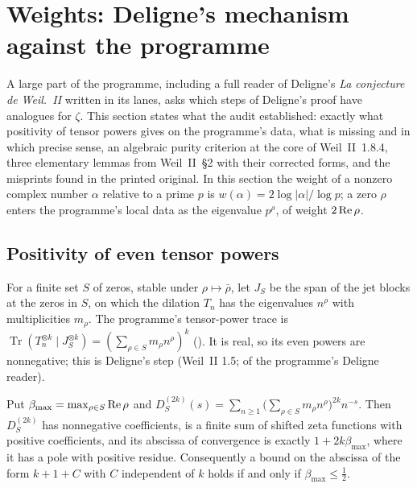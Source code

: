 \section{Weights: Deligne's mechanism against the programme}\label{sec:deligne}

A large part of the programme, including a full reader of Deligne's \emph{La conjecture de Weil.~II} \cite{DeligneWeilII} written in its lanes, asks which steps of Deligne's proof have analogues for $\zeta$.
This section states what the audit established: exactly what positivity of tensor powers gives on the programme's data, what is missing and in which precise sense, an algebraic purity criterion at the core of Weil~II~1.8.4, three elementary lemmas from Weil~II~§2 with their corrected forms, and the misprints found in the printed original.
In this section the weight of a nonzero complex number $\alpha$ relative to a prime $p$ is $w(\alpha)=2\log|\alpha|/\log p$; a zero $\rho$ enters the programme's local data as the eigenvalue $p^\rho$, of weight $2\operatorname{Re}\rho$.

\subsection{Positivity of even tensor powers}

For a finite set $S$ of zeros, stable under $\rho\mapsto\bar\rho$, let $J_S$ be the span of the jet blocks at the zeros in $S$, on which the dilation $T_n$ has the eigenvalues $n^\rho$ with multiplicities $m_\rho$. The programme's tensor-power trace is $\operatorname{Tr}(T_n^{\otimes k}\mid J_S^{\otimes k})=(\sum_{\rho\in S}m_\rho n^\rho)^k$ (). It is real, so its even powers are nonnegative; this is Deligne's step (Weil~II 1.5;  of the programme's Deligne reader).

\begin{proposition}\label{prop:abscissa}
Put $\beta_{\max}=\max_{\rho\in S}\operatorname{Re}\rho$ and $D_S^{(2k)}(s)=\sum_{n\ge1}\big(\sum_{\rho\in S}m_\rho n^\rho\big)^{2k}n^{-s}$. Then $D_S^{(2k)}$ has nonnegative coefficients, is a finite sum of shifted zeta functions with positive coefficients, and its abscissa of convergence is exactly $1+2k\beta_{\max}$, where it has a pole with positive residue. Consequently a bound on the abscissa of the form $k+1+C$ with $C$ independent of $k$ holds if and only if $\beta_{\max}\le\tfrac12$.
\end{proposition}

